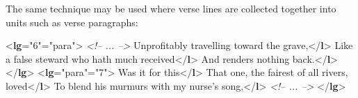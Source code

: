 The same technique may be used where verse lines are collected together into units such as verse paragraphs: \par\bgroup{}\exampleFont \begin{shaded}\noindent\mbox{}{<\textbf{lg}\hspace*{1em}{n}="{6}"\hspace*{1em}{type}="{para}">}\mbox{}\newline 
\textit{<!-- ... -->}\mbox{}\newline 
{}Unprofitably travelling toward the grave,{</\textbf{l}>}\mbox{}\newline 
{}Like a false steward who hath much received{</\textbf{l}>}\mbox{}\newline 
{}And renders nothing back.{</\textbf{l}>}\mbox{}\newline 
{</\textbf{lg}>}\mbox{}\newline 
{<\textbf{lg}\hspace*{1em}{type}="{para}"\hspace*{1em}{n}="{7}">}\mbox{}\newline 
{}Was it for this{</\textbf{l}>}\mbox{}\newline 
{}That one, the fairest of all rivers, loved{</\textbf{l}>}\mbox{}\newline 
{}To blend his murmurs with my nurse's song,{</\textbf{l}>}\mbox{}\newline 
\textit{<!-- ... -->}\mbox{}\newline 
{</\textbf{lg}>}\end{shaded}\egroup\par \par
